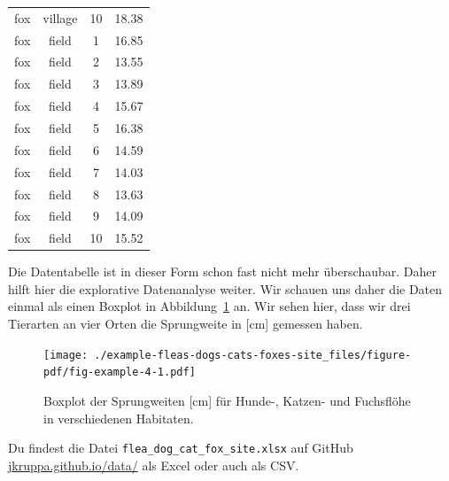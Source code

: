 \documentclass[
  letterpaper,
]{scrbook}
\begin{document}
\begin{longtable}[]{@{}cccc@{}}
fox & village & 10 & 18.38 \\
fox & field & 1 & 16.85 \\
fox & field & 2 & 13.55 \\
fox & field & 3 & 13.89 \\
fox & field & 4 & 15.67 \\
fox & field & 5 & 16.38 \\
fox & field & 6 & 14.59 \\
fox & field & 7 & 14.03 \\
fox & field & 8 & 13.63 \\
fox & field & 9 & 14.09 \\
fox & field & 10 & 15.52 \\
\bottomrule()
\end{longtable}

{}

Die Datentabelle ist in dieser Form schon fast nicht mehr überschaubar.
Daher hilft hier die explorative Datenanalyse weiter. Wir schauen uns
daher die Daten einmal als einen Boxplot in
Abbildung~\ref{fig-example-4} an. Wir sehen hier, dass wir drei
Tierarten an vier Orten die Sprungweite in {[}cm{]} gemessen haben.

\begin{figure}

{\centering \texttt{[image: ./example-fleas-dogs-cats-foxes-site\_files/figure-pdf/fig-example-4-1.pdf]}

}

\caption{\label{fig-example-4}Boxplot der Sprungweiten {[}cm{]} für
Hunde-, Katzen- und Fuchsflöhe in verschiedenen Habitaten.}

\end{figure}

\begin{tcolorbox}[enhanced jigsaw, coltitle=black, titlerule=0mm, bottomrule=.15mm, opacityback=0, opacitybacktitle=0.6, leftrule=.75mm, title=\textcolor{quarto-callout-tip-color}{\faLightbulb}\hspace{0.5em}{Datei für von Flöhen auf Tieren in Habitaten}, toprule=.15mm, bottomtitle=1mm, toptitle=1mm, left=2mm, breakable, arc=.35mm, colback=white, rightrule=.15mm, colbacktitle=quarto-callout-tip-color!10!white, colframe=quarto-callout-tip-color-frame]
Du findest die Datei \texttt{flea\_dog\_cat\_fox\_site.xlsx} auf GitHub
\href{https://github.com/jkruppa/jkruppa.github.io/tree/master/data}{jkruppa.github.io/data/}
als Excel oder auch als CSV.
\end{tcolorbox}
\end{document}
